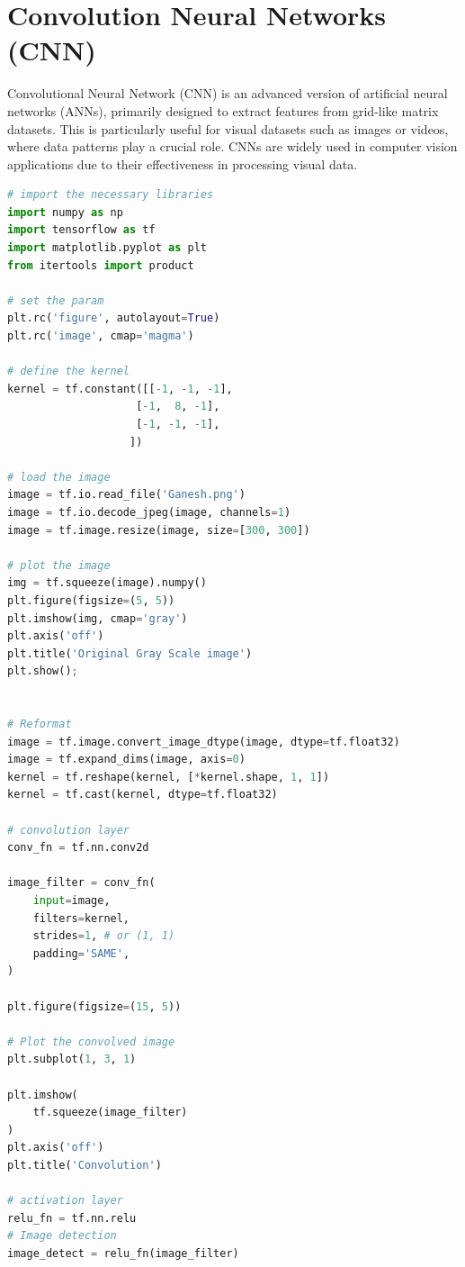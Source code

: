 \documentclass{article}
\begin{document}
\section{ Convolution Neural Networks (CNN)}
Convolutional Neural Network (CNN) is an advanced version of artificial neural networks (ANNs), primarily designed to extract features from grid-like matrix datasets. This is particularly useful for visual datasets such as images or videos, where data patterns play a crucial role. CNNs are widely used in computer vision applications due to their effectiveness in processing visual data.
\begin{center}
\begin{lstlisting}[language=Python, caption={Applying CNN to an Image}, label={lst:logreg}, backgroundcolor=\color{gray!10}, frame=single, keywordstyle=\color{blue}\bfseries, commentstyle=\color{green!50!black}, stringstyle=\color{orange}]
# import the necessary libraries
import numpy as np
import tensorflow as tf
import matplotlib.pyplot as plt
from itertools import product

# set the param 
plt.rc('figure', autolayout=True)
plt.rc('image', cmap='magma')

# define the kernel
kernel = tf.constant([[-1, -1, -1],
                    [-1,  8, -1],
                    [-1, -1, -1],
                   ])

# load the image
image = tf.io.read_file('Ganesh.png')
image = tf.io.decode_jpeg(image, channels=1)
image = tf.image.resize(image, size=[300, 300])

# plot the image
img = tf.squeeze(image).numpy()
plt.figure(figsize=(5, 5))
plt.imshow(img, cmap='gray')
plt.axis('off')
plt.title('Original Gray Scale image')
plt.show();


# Reformat
image = tf.image.convert_image_dtype(image, dtype=tf.float32)
image = tf.expand_dims(image, axis=0)
kernel = tf.reshape(kernel, [*kernel.shape, 1, 1])
kernel = tf.cast(kernel, dtype=tf.float32)

# convolution layer
conv_fn = tf.nn.conv2d

image_filter = conv_fn(
    input=image,
    filters=kernel,
    strides=1, # or (1, 1)
    padding='SAME',
)

plt.figure(figsize=(15, 5))

# Plot the convolved image
plt.subplot(1, 3, 1)

plt.imshow(
    tf.squeeze(image_filter)
)
plt.axis('off')
plt.title('Convolution')

# activation layer
relu_fn = tf.nn.relu
# Image detection
image_detect = relu_fn(image_filter)


\end{lstlisting}
\end{center}
\end{document}
